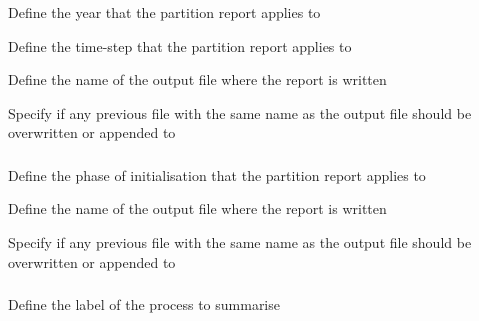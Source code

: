 \subsubsection[Print the partition]{}

 {Define the year that the partition report applies to}

 {Define the time-step that the partition report applies to}

 {Define the name of the output file where the report is written}

 {Specify if any previous file with the same name as the output file should be overwritten or appended to}

\subsubsection[Print the partition at initialisation]{}

 {Define the phase of initialisation that the partition report applies to}

 {Define the name of the output file where the report is written}

 {Specify if any previous file with the same name as the output file should be overwritten or appended to}

\subsubsection[Print a summary of a process]{}

 {Define the label of the process to summarise}

